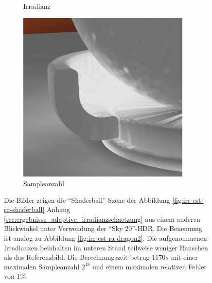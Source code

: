 \begin{figure}[h]
\begin{subfigure}[t]{0.33\textwidth}
				\caption{Irradianz}
			\end{subfigure}
			\begin{subfigure}[t]{0.33\textwidth}
				\center
				\includegraphics[width=0.95\textwidth]{pic/irr_est-ra-shaderball2-scount.png}
				\caption{Sampleanzahl}
			\end{subfigure}
			\caption[Vertex Lighting anhand der \enquote{Shaderball}-Szene mit \enquote{Ennis-Brown House}-HDR]{Die Bilder zeigen die \enquote{Shaderball}-Szene der Abbildung \ref{fig:irr-est-ra-shaderball} Anhang \ref{sec:ergebnisse_adaptive_irradianzschaetzung} aus einem anderen Blickwinkel unter Verwendung der \enquote{Sky 20}-HDR. Die Benennung ist analog zu Abbildung \ref{fig:irr-est-ra-dragon2}. Die aufgenommenen Irradianzen beinhalten im unteren Stand teilweise weniger Rauschen als das Referenzbild. Die Berechnungszeit betrug $1170\unit{s}$ mit einer maximalen Sampleanzahl $2^{18}$ und einem maximalen relativen Fehler von $1\unit{\%}$.}
			\label{fig:irr-est-ra-shaderball2}
		\end{figure}

